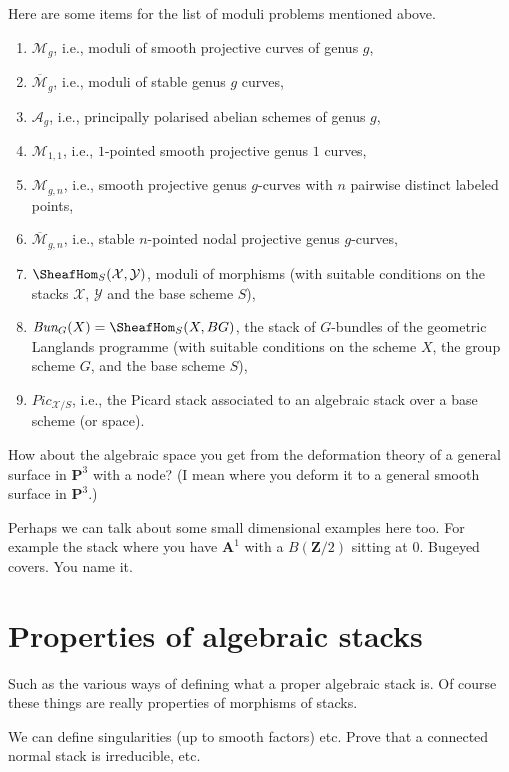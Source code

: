 \medskip\noindent
Here are some items for the list of moduli problems mentioned above.
\begin{enumerate}
\item $\mathcal{M}_g$, i.e., moduli of smooth projective curves of genus $g$,
\item $\overline{\mathcal{M}}_g$, i.e., moduli of stable genus $g$ curves,
\item $\mathcal{A}_g$,
i.e., principally polarised abelian schemes of genus $g$,
\item $\mathcal{M}_{1, 1}$, i.e.,
$1$-pointed smooth projective genus $1$ curves,
\item $\mathcal{M}_{g, n}$, i.e., smooth projective genus $g$-curves
with $n$ pairwise distinct labeled points,
\item $\overline{\mathcal{M}}_{g, n}$, i.e.,
stable $n$-pointed nodal projective genus $g$-curves,
\item $\SheafHom_S(\mathcal{X}, \mathcal{Y})$, moduli of morphisms
(with suitable conditions on the stacks $\mathcal{X}$, $\mathcal{Y}$
and the base scheme $S$),
\item $\textit{Bun}_G(X) = \SheafHom_S(X, BG)$, the stack of $G$-bundles
of the geometric Langlands programme (with suitable conditions on the scheme
$X$, the group scheme $G$, and the base scheme $S$),
\item $\textit{Pic}_{\mathcal{X}/S}$, i.e., the Picard stack associated
to an algebraic stack over a base scheme (or space).
\end{enumerate}

\medskip\noindent
How about the algebraic space you get from the deformation theory of
a general surface in $\mathbf{P}^3$ with a node? (I mean where you deform
it to a general smooth surface in $\mathbf{P}^3$.)

\medskip\noindent
Perhaps we can talk about some small dimensional examples here too.
For example the stack where you have $\mathbf{A}^1$ with a $B(\mathbf{Z}/2)$
sitting at $0$. Bugeyed covers. You name it.

\section{Properties of algebraic stacks}
\label{section-stacks-properties}

\noindent
Such as the various ways of defining what a proper algebraic stack is.
Of course these things are really properties of morphisms of stacks.

\medskip\noindent
We can define singularities (up to smooth factors) etc. Prove that a
connected normal stack is irreducible, etc.

